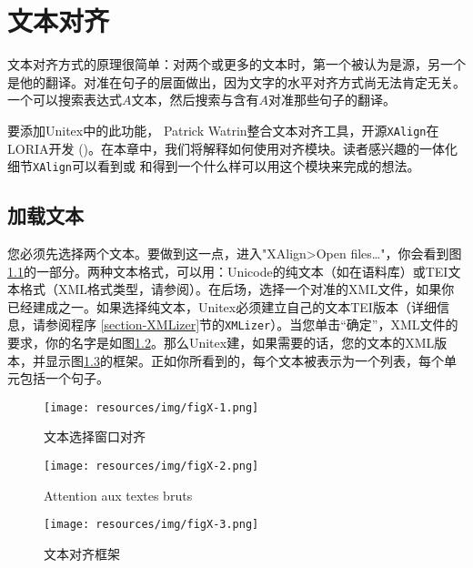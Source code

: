 
\chapter{文本对齐}
\label{chap-alignment}

文本对齐方式的原理很简单：对两个或更多的文本时，第一个被认为是源，另一个是他的翻译。对准在句子的层面做出，因为文字的水平对齐方式尚无法肯定无关。一个可以搜索表达式$A$文本，然后搜索与含有$A$对准那些句子的翻译。

\bigskip
\noindent 要添加Unitex中的此功能， Patrick Watrin整合文本对齐工具，开源\verb+XAlign+在LORIA开发 (\cite{XAlign})。在本章中，我们将解释如何使用对齐模块。读者感兴趣的一体化细节\verb+XAlign+可以看到\cite{IGML_DumPau08}或\cite{IGML_PauDum08} 和\cite{dusko_xalign}得到一个什么样可以用这个模块来完成的想法。

\section{加载文本}
您必须先选择两个文本。要做到这一点，进入"XAlign>Open files\ldots"，你会看到图\ref{fig-x-text-selection}的一部分。两种文本格式，可以用：Unicode的纯文本（如在语料库）或TEI文本格式（XML格式类型，请参阅\cite{TEI}）。在后场，选择一个对准的XML文件，如果你已经建成之一。如果选择纯文本，Unitex必须建立自己的文本TEI版本（详细信息，请参阅程序 \ref{section-XMLizer}节的\verb+XMLizer+）。当您单击“确定”，XML文件的要求，你的名字是如图\ref{fig-x-tei-name}。那么Unitex建，如果需要的话，您的文本的XML版本，并显示图\ref{fig-x-frame}的框架。正如你所看到的，每个文本被表示为一个列表，每个单元包括一个句子。

\begin{figure}[!ht]
\begin{center}
\texttt{[image: resources/img/figX-1.png]}
\caption{文本选择窗口对齐\label{fig-x-text-selection}}
\end{center}
\end{figure}

\begin{figure}[!ht]
\begin{center}
\texttt{[image: resources/img/figX-2.png]}
\caption{Attention aux textes bruts\label{fig-x-tei-name}}
\end{center}
\end{figure}
\clearpage

\begin{figure}[!ht]
\begin{center}
\texttt{[image: resources/img/figX-3.png]}
\caption{文本对齐框架\label{fig-x-frame}}
\end{center}
\end{figure}

